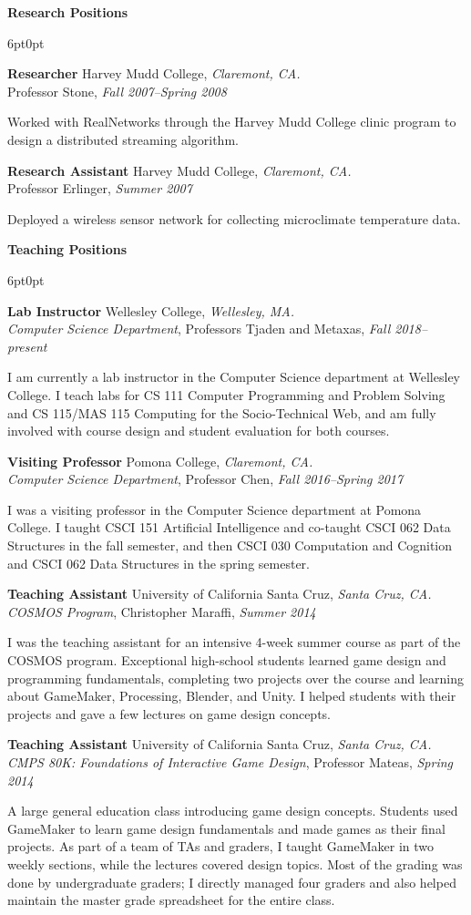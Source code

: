\documentclass[11pt]{article}
\newenvironment{sct}[1]{%
  \vspace{8pt plus 2pt minus 4pt}\textbf{\Large #1} \hrulefill\vspace{6pt}
  \begin{adjustwidth}{6pt}{0pt}
}{%
  \end{adjustwidth}
}
\newcommand{\indented}[1]{\hspace*{\fill}\parbox{\textwidth-22pt}{#1}}
\newcommand{\experience}[6]{%
  \textbf{#1} #2, \textit{#3.} \\
  #4, \textit{#5} \\
  \indented{#6}
  \vspace{7pt plus 2pt minus 2pt}
}
\newcommand{\teachingexperience}[7]{%
  \textbf{#1} #2, \textit{#3.} \\
  \textit{#4}, #5, \textit{#6} \\
  \indented{#7}
  \vspace{7pt plus 2pt minus 2pt}
}
\newcommand{\combexp}[4]{%
  \textbf{#1} #2, \textit{#3.} \\
  #4 \vspace{7pt plus 2pt minus 2pt}
}
\begin{document}
\begin{sct}{Research Positions}
\experience{Researcher}{Harvey Mudd College}{Claremont, CA}%
{Professor Stone}{Fall 2007--Spring 2008}{
  Worked with RealNetworks through the Harvey Mudd College clinic
  program to design a distributed streaming algorithm.
}

\experience{Research Assistant}{Harvey Mudd College}{Claremont, CA}%
{Professor Erlinger}{Summer 2007}{
  Deployed a wireless sensor network for collecting microclimate
  temperature data.
}

\end{sct}

\newpage

\begin{sct}{Teaching Positions}

\teachingexperience{Lab Instructor}{Wellesley College}{Wellesley, MA}%
{Computer Science Department}{Professors Tjaden and Metaxas}{Fall 2018--present}%
{I am currently a lab instructor in the Computer Science department at
  Wellesley College. I teach labs for CS 111 Computer Programming and
  Problem Solving and CS 115/MAS 115 Computing for the Socio-Technical
  Web, and am fully involved with course design and student evaluation
  for both courses.}

\teachingexperience{Visiting Professor}{Pomona College}{Claremont, CA}%
{Computer Science Department}{Professor Chen}{Fall 2016--Spring 2017}%
{I was a visiting professor in the Computer Science department at Pomona
  College. I taught CSCI 151 Artificial Intelligence and co-taught CSCI
  062 Data Structures in the fall semester, and then CSCI 030
  Computation and Cognition and CSCI 062 Data Structures in the spring
  semester.}

\teachingexperience{Teaching Assistant}{University of California Santa Cruz}{Santa Cruz, CA}%
{COSMOS Program}{Christopher Maraffi}{Summer 2014}
{I was the teaching assistant for an intensive 4-week summer course as
  part of the COSMOS program. Exceptional high-school students learned
  game design and programming fundamentals, completing two projects over
  the course and learning about GameMaker, Processing, Blender, and
  Unity. I helped students with their projects and gave a few lectures
  on game design concepts.}

\combexp{Teaching Assistant}{University of California Santa Cruz}{Santa Cruz, CA}%
{
\textit{CMPS 80K: Foundations of Interactive Game Design}, Professor Mateas, \textit{Spring 2014} \\
\indented{
  A large general education class introducing game design concepts.
  Students used GameMaker to learn game design fundamentals and made
  games as their final projects. As part of a team of TAs and graders, I
  taught GameMaker in two weekly sections, while the lectures covered
  design topics. Most of the grading was done by undergraduate graders;
  I directly managed four graders and also helped maintain the master
  grade spreadsheet for the entire class.
}
\vspace{6pt}

}
\end{sct}
\end{document}
